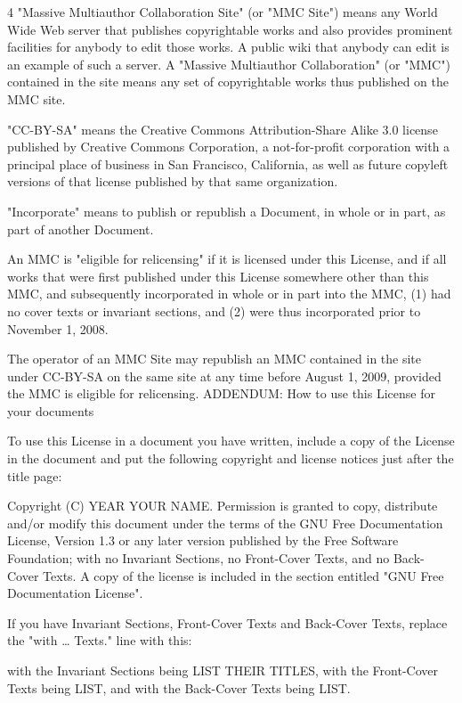 \documentclass[fontsize=11pt,paper=A4,BCOR=12mm,DIV=13,open=any,listof=totoc,toc=flat]{scrbook}
\begin{document}
{\begin{multicols}{4}
"Massive Multiauthor Collaboration Site" (or "MMC Site") means any World Wide Web server that publishes copyrightable works and also provides prominent facilities for anybody to edit those works. A public wiki that anybody can edit is an example of such a server. A "Massive Multiauthor Collaboration" (or "MMC") contained in the site means any set of copyrightable works thus published on the MMC site.

"CC-BY-SA" means the Creative Commons Attribution-Share Alike 3.0 license published by Creative Commons Corporation, a not-for-profit corporation with a principal place of business in San Francisco, California, as well as future copyleft versions of that license published by that same organization.

"Incorporate" means to publish or republish a Document, in whole or in part, as part of another Document.

An MMC is "eligible for relicensing" if it is licensed under this License, and if all works that were first published under this License somewhere other than this MMC, and subsequently incorporated in whole or in part into the MMC, (1) had no cover texts or invariant sections, and (2) were thus incorporated prior to November 1, 2008.

The operator of an MMC Site may republish an MMC contained in the site under CC-BY-SA on the same site at any time before August 1, 2009, provided the MMC is eligible for relicensing.
ADDENDUM: How to use this License for your documents

To use this License in a document you have written, include a copy of the License in the document and put the following copyright and license notices just after the title page:

    Copyright (C)  YEAR  YOUR NAME.
    Permission is granted to copy, distribute and/or modify this document
    under the terms of the GNU Free Documentation License, Version 1.3
    or any later version published by the Free Software Foundation;
    with no Invariant Sections, no Front-Cover Texts, and no Back-Cover Texts.
    A copy of the license is included in the section entitled "GNU
    Free Documentation License".

If you have Invariant Sections, Front-Cover Texts and Back-Cover Texts, replace the "with … Texts." line with this:

    with the Invariant Sections being LIST THEIR TITLES, with the
    Front-Cover Texts being LIST, and with the Back-Cover Texts being LIST.


\end{multicols}}
\end{document}
